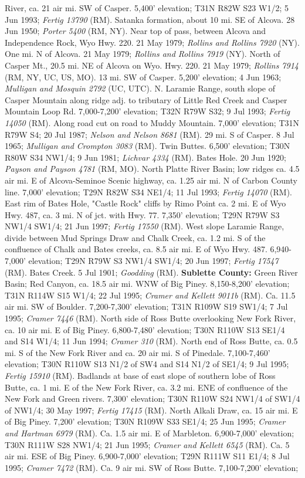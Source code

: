 River, ca. 21 air mi. SW of Casper. 5,400’ elevation; T31N R82W S23 W1/2; 5 Jun 1993; \textit{Fertig 13790} (RM).  Satanka formation, about 10 mi. SE of Alcova. 28 Jun 1950; \textit{Porter 5400} (RM, NY).  Near top of pass, between Alcova and Independence Rock, Wyo Hwy. 220. 21 May 1979; \textit{Rollins and Rollins 7920} (NY).  One mi. N of Alcova. 21 May 1979; \textit{Rollins and Rollins 7919} (NY).   North of Casper Mt., 20.5 mi. NE of Alcova on Wyo. Hwy. 220. 21 May 1979; \textit{Rollins 7914} (RM, NY, UC, US, MO).  13 mi. SW of Casper. 5,200’ elevation; 4 Jun 1963; \textit{Mulligan and Mosquin 2792} (UC, UTC).  N. Laramie Range, south slope of Casper Mountain along ridge adj. to tributary of Little Red Creek and Casper Mountain Loop Rd. 7,000-7,200’ elevation; T32N R79W S32; 9 Jul 1993; \textit{Fertig 14050} (RM).  Along road cut on road to Muddy Mountain. 7,000’ elevation; T31N R79W S4; 20 Jul 1987; \textit{Nelson and Nelson 8681} (RM).  29 mi. S of Casper. 8 Jul 1965; \textit{Mulligan and Crompton 3083} (RM).  Twin Buttes. 6,500’ elevation; T30N R80W S34 NW1/4; 9 Jun 1981; \textit{Lichvar 4334} (RM).  Bates Hole. 20 Jun 1920; \textit{Payson and Payson 4781} (RM, MO).  North Platte River Basin; low ridges ca. 4.5 air mi. E of Alcova-Seminoe Scenic highway, ca. 1.25 air mi. N of Carbon County line. 7,000’ elevation; T29N R82W S34 NE1/4; 11 Jul 1993; \textit{Fertig 14070} (RM).  East rim of Bates Hole, "Castle Rock" cliffs by Rimo Point ca. 2 mi. E of Wyo Hwy. 487, ca. 3 mi. N of jct. with Hwy. 77. 7,350’ elevation; T29N R79W S3 NW1/4 SW1/4; 21 Jun 1997; \textit{Fertig 17550} (RM).  West slope Laramie Range, divide between Mud Springs Draw and Chalk Creek, ca. 1.2 mi. S of the confluence of Chalk and Bates creeks, ca. 8.5 air mi. E of Wyo Hwy. 487. 6,940-7,000' elevation; T29N R79W S3 NW1/4 SW1/4; 20 Jun 1997; \textit{Fertig 17547} (RM).  Bates Creek. 5 Jul 1901; \textit{Goodding} (RM).  \textbf{Sublette County:} Green River Basin; Red Canyon, ca. 18.5 air mi. WNW of Big Piney. 8,150-8,200’ elevation; T31N R114W S15 W1/4; 22 Jul 1995; \textit{Cramer and Kellett 9011b} (RM).  Ca. 11.5 air mi. SW of Boulder. 7,200-7,300’ elevation; T31N R109W S19 SW1/4; 7 Jul 1995; \textit{Cramer 7446} (RM).  North side of Ross Butte overlooking New Fork River, ca. 10 air mi. E of Big Piney. 6,800-7,480’ elevation; T30N R110W S13 SE1/4 and S14 W1/4; 11 Jun 1994; \textit{Cramer 310} (RM). North end of Ross Butte, ca. 0.5 mi. S of the New Fork River and ca. 20 air mi. S of Pinedale. 7,100-7,460’ elevation; T30N R110W S13 N1/2 of SW4 and S14 N1/2 of SE1/4; 9 Jul 1995; \textit{Fertig 15910} (RM).  Badlands at base of east slope of southern lobe of Ross Butte, ca. 1 mi. E of the New Fork River, ca. 3.2 mi. ENE of confluence of the New Fork and Green rivers. 7,300’ elevation; T30N R110W S24 NW1/4 of SW1/4 of NW1/4; 30 May 1997; \textit{Fertig 17415} (RM).  North Alkali Draw, ca. 15 air mi. E of Big Piney. 7,200’ elevation; T30N R109W S33 SE1/4; 25 Jun 1995; \textit{Cramer and Hartman 6979} (RM).  Ca. 1.5 air mi. E of Marbleton. 6,900-7,000’ elevation; T30N R111W S28 NW1/4; 21 Jun 1995; \textit{Cramer and Kellett 6545} (RM).  Ca. 5 air mi. ESE of Big Piney. 6,900-7,000’ elevation; T29N R111W S11 E1/4; 8 Jul 1995; \textit{Cramer 7472} (RM).  Ca. 9 air mi. SW of Ross Butte. 7,100-7,200’ elevation; 